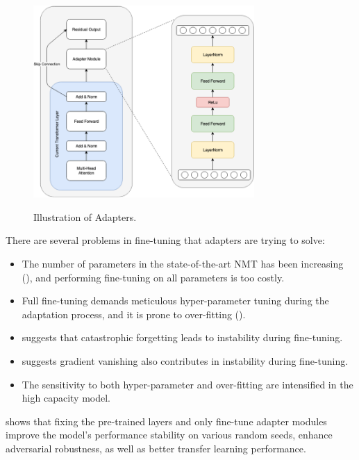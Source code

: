 \begin{figure}[h]
    {\includegraphics[width=0.75\textwidth]{img/adapter_module.png}}
    \centering
    \caption{Illustration of Adapters.}
    \label{img:adapters}
\end{figure}

There are several problems in fine-tuning that adapters are trying to solve:
\begin{itemize}
    \item The number of parameters in the state-of-the-art NMT has been increasing (\cite{Shazeer2018MeshTensorFlowDL,Bapna2018TrainingDN,Huang2019GPipeET}), and performing fine-tuning on all parameters is too costly.
    \item Full fine-tuning demands meticulous hyper-parameter tuning during the adaptation process, and it is prone to over-fitting (\cite{Sennrich2016ImprovingNM,Barone2017RegularizationTF}).
    \item \cite{Lee2020MixoutER} suggests that catastrophic forgetting leads to instability during fine-tuning.
    \item \cite{Mosbach2021OnTS} suggests gradient vanishing also contributes in instability during fine-tuning.
    \item The sensitivity to both hyper-parameter and over-fitting are intensified in the high capacity model.
\end{itemize}

\cite{han2021robust} shows that fixing the pre-trained layers and only fine-tune adapter modules improve the model's performance stability on various random seeds, enhance adversarial robustness, as well as better transfer learning performance.

